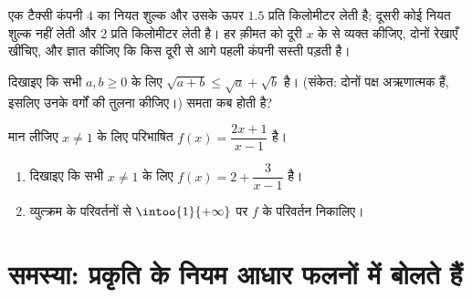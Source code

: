 \begin{exercise}[$\star\star$]\label{exo:g10:reffunc:8}
एक टैक्सी कंपनी $4$ का नियत शुल्क और उसके ऊपर $1.5$ प्रति किलोमीटर लेती
है; दूसरी कोई नियत शुल्क नहीं लेती और $2$ प्रति किलोमीटर लेती है। हर
क़ीमत को दूरी $x$ के  से व्यक्त कीजिए, दोनों रेखाएँ खींचिए, और
ज्ञात कीजिए कि किस दूरी से आगे पहली कंपनी सस्ती पड़ती है।
\end{exercise}

\begin{exercise}[$\star\star$]\label{exo:g10:reffunc:9}
दिखाइए कि सभी $a, b \geq 0$ के लिए $\sqrt{a + b} \leq \sqrt a + \sqrt b$ है। (संकेत: दोनों पक्ष अऋणात्मक हैं,
इसलिए उनके वर्गों की तुलना कीजिए।) समता कब होती है?
\end{exercise}

\begin{exercise}[$\star\star\star$]\label{exo:g10:reffunc:10}
मान लीजिए $x \neq 1$ के लिए परिभाषित $f(x) = \dfrac{2x + 1}{x - 1}$ है।
\begin{enumerate}
  \item दिखाइए कि सभी $x \neq 1$ के लिए $f(x) = 2 + \dfrac{3}{x - 1}$ है।
  \item व्युत्क्रम  के परिवर्तनों से $\intoo{1}{+\infty}$ पर $f$ के परिवर्तन निकालिए।
\end{enumerate}
\end{exercise}

\section{समस्या: प्रकृति के नियम आधार फलनों में बोलते हैं}

